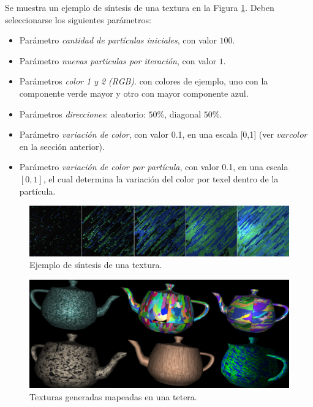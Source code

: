 Se muestra un ejemplo de s\'intesis de una textura en la Figura \ref{sintesis}. Deben seleccionarse los siguientes par\'ametros:

\begin{itemize}
\item Par\'ametro {\em cantidad de part\'iculas iniciales}, con valor $100$.
\item Par\'ametro {\em nuevas particulas por iteraci\'on}, con valor $1$.
\item Par\'ametros {\em color 1 y 2 (RGB)}. con colores de ejemplo, uno con la componente verde mayor y otro con mayor componente azul.
\item Par\'ametros {\em direcciones}: aleatorio: $50\%$, diagonal $50\%$.
\item Par\'ametro {\em variaci\'on de color}, con valor 0.1, en una escala [0,1] (ver $varcolor$ en la secci\'on anterior).
\item Par\'ametro {\em variaci\'on de color por part\'icula}, con valor 0.1, en una escala $[0,1]$, el cual determina la variaci\'on del color por texel dentro de la part\'icula.
\end{itemize}

\begin{figure}[t!]
\centering
\includegraphics[scale=0.12]{figures/sintesis}
\caption{Ejemplo de s\'intesis de una textura.}
\label{sintesis}
\end{figure}

\begin{figure}[t!]
\centering
\includegraphics[scale=0.14]{figures/teteras}
\caption{Texturas generadas mapeadas en una tetera.}
\label{teteras}
\end{figure}


